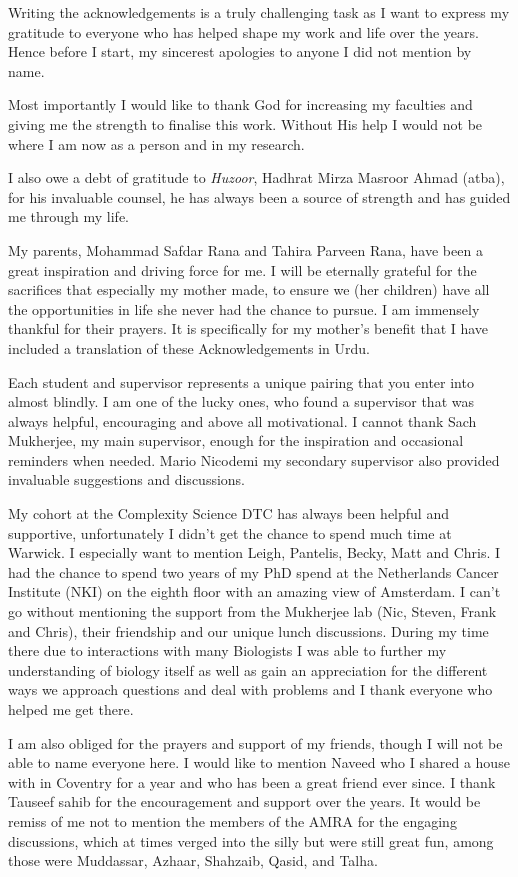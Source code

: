 
Writing the acknowledgements is a truly challenging task as I want to express my gratitude to everyone who has helped shape my work and life over the years. Hence before I start, my sincerest apologies to anyone I did not mention by name.

Most importantly I would like to thank God for increasing my faculties and giving me the strength to finalise this work. Without His help I would not be where I am now as a person and in my research.

I also owe a debt of gratitude to \emph{Huzoor}, Hadhrat Mirza Masroor Ahmad (atba), for his invaluable counsel, he has always been a source of strength and has guided me through my life.

My parents, Mohammad Safdar Rana and Tahira Parveen Rana, have been a great inspiration and driving force for me.  I will be eternally grateful for the sacrifices that especially my mother made, to ensure we (her children)  have all the opportunities in life she never had the chance to pursue. I am immensely thankful for their prayers.  It is specifically for my mother's benefit that I have included a translation of these Acknowledgements in Urdu.

Each student and supervisor represents a unique pairing that you enter into almost blindly. I am one of the lucky ones, who found a supervisor that was always helpful, encouraging and above all motivational. I cannot thank Sach Mukherjee, my main supervisor, enough for the inspiration and occasional reminders when needed. Mario Nicodemi my secondary supervisor also provided invaluable suggestions and discussions.

My cohort at the Complexity Science DTC has always been helpful and supportive, unfortunately I didn't get the chance to spend much time at Warwick. I especially want to mention Leigh, Pantelis, Becky, Matt and Chris. I had the chance to spend two years of my PhD spend at the Netherlands Cancer Institute (NKI) on the eighth floor  with an amazing view of Amsterdam. I can't go without mentioning the support from the Mukherjee lab (Nic, Steven, Frank and Chris), their friendship and our unique lunch discussions. During my time there due to interactions with many Biologists I was able to further my understanding of biology itself as well as gain an appreciation for the different ways we approach questions and deal with problems and I thank everyone who helped me get there.

I am also obliged for the prayers and support of my friends, though I will not be able to name everyone here. I would like to mention Naveed who I shared a house with in Coventry for a year and who has been a great friend ever since. I thank Tauseef sahib for the encouragement and support over the years.  It would be remiss of me not to mention the members of the AMRA for the engaging discussions, which at times verged into the silly but were still great fun, among those were Muddassar, Azhaar, Shahzaib, Qasid, and Talha.

